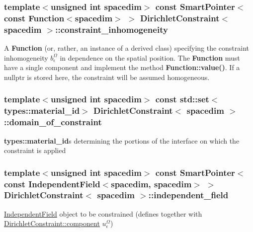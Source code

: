 \subsubsection[{\texorpdfstring{constraint\+\_\+inhomogeneity}{constraint_inhomogeneity}}]{\setlength{\rightskip}{0pt plus 5cm}template$<$unsigned int spacedim$>$ const {\bf Smart\+Pointer}$<$const {\bf Function}$<$spacedim$>$ $>$ {\bf Dirichlet\+Constraint}$<$ spacedim $>$\+::constraint\+\_\+inhomogeneity}\hypertarget{class_dirichlet_constraint_af22d2bca23999bdb4f2b67e8982d29c5}{}\label{class_dirichlet_constraint_af22d2bca23999bdb4f2b67e8982d29c5}
A {\bf Function} (or, rather, an instance of a derived class) specifying the constraint inhomogeneity $b^\Omega_\epsilon$ in dependence on the spatial position. The {\bf Function} must have a single component and implement the method {\bf Function\+::value()}. If a {\ttfamily nullptr} is stored here, the constraint will be assumed homogeneous. 
\subsubsection[{\texorpdfstring{domain\+\_\+of\+\_\+constraint}{domain_of_constraint}}]{\setlength{\rightskip}{0pt plus 5cm}template$<$unsigned int spacedim$>$ const std\+::set$<${\bf types\+::material\+\_\+id}$>$ {\bf Dirichlet\+Constraint}$<$ spacedim $>$\+::domain\+\_\+of\+\_\+constraint}\hypertarget{class_dirichlet_constraint_a258b6ff11b206f966bb03943bb11f469}{}\label{class_dirichlet_constraint_a258b6ff11b206f966bb03943bb11f469}
{\bf types\+::material\+\_\+id}s determining the portions of the interface on which the constraint is applied 
\subsubsection[{\texorpdfstring{independent\+\_\+field}{independent_field}}]{\setlength{\rightskip}{0pt plus 5cm}template$<$unsigned int spacedim$>$ const {\bf Smart\+Pointer}$<$const {\bf Independent\+Field}$<$spacedim, spacedim$>$ $>$ {\bf Dirichlet\+Constraint}$<$ spacedim $>$\+::independent\+\_\+field}\hypertarget{class_dirichlet_constraint_abbd7945a973ed93d1d773307393ffde3}{}\label{class_dirichlet_constraint_abbd7945a973ed93d1d773307393ffde3}
\hyperlink{class_independent_field}{Independent\+Field} object to be constrained (defines together with \hyperlink{class_dirichlet_constraint_a7e3c4d0e0906af1c81b88e05e41bdafc}{Dirichlet\+Constraint\+::component} $u^\Omega_\epsilon$) 
